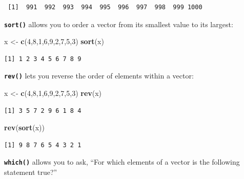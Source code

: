 \documentclass[
]{book}
\newenvironment{Shaded}{\begin{snugshade}}{\end{snugshade}}
\newcommand{\DecValTok}[1]{\textcolor[rgb]{0.00,0.00,0.81}{#1}}
\newcommand{\KeywordTok}[1]{\textcolor[rgb]{0.13,0.29,0.53}{\textbf{#1}}}
\newcommand{\NormalTok}[1]{#1}
\newcommand{\StringTok}[1]{\textcolor[rgb]{0.31,0.60,0.02}{#1}}
\begin{document}
\begin{verbatim}
 [1]  991  992  993  994  995  996  997  998  999 1000
\end{verbatim}

\textbf{\texttt{sort()}} allows you to order a vector from its smallest value to its largest:

\begin{Shaded}
\begin{Highlighting}[]
\NormalTok{x <-}\StringTok{ }\KeywordTok{c}\NormalTok{(}\DecValTok{4}\NormalTok{,}\DecValTok{8}\NormalTok{,}\DecValTok{1}\NormalTok{,}\DecValTok{6}\NormalTok{,}\DecValTok{9}\NormalTok{,}\DecValTok{2}\NormalTok{,}\DecValTok{7}\NormalTok{,}\DecValTok{5}\NormalTok{,}\DecValTok{3}\NormalTok{)}
\KeywordTok{sort}\NormalTok{(x)}
\end{Highlighting}
\end{Shaded}

\begin{verbatim}
[1] 1 2 3 4 5 6 7 8 9
\end{verbatim}

\textbf{\texttt{rev()}} lets you reverse the order of elements within a vector:

\begin{Shaded}
\begin{Highlighting}[]
\NormalTok{x <-}\StringTok{ }\KeywordTok{c}\NormalTok{(}\DecValTok{4}\NormalTok{,}\DecValTok{8}\NormalTok{,}\DecValTok{1}\NormalTok{,}\DecValTok{6}\NormalTok{,}\DecValTok{9}\NormalTok{,}\DecValTok{2}\NormalTok{,}\DecValTok{7}\NormalTok{,}\DecValTok{5}\NormalTok{,}\DecValTok{3}\NormalTok{)}
\KeywordTok{rev}\NormalTok{(x)}
\end{Highlighting}
\end{Shaded}

\begin{verbatim}
[1] 3 5 7 2 9 6 1 8 4
\end{verbatim}

\begin{Shaded}
\begin{Highlighting}[]
\KeywordTok{rev}\NormalTok{(}\KeywordTok{sort}\NormalTok{(x))}
\end{Highlighting}
\end{Shaded}

\begin{verbatim}
[1] 9 8 7 6 5 4 3 2 1
\end{verbatim}

\textbf{\texttt{which()}} allows you to ask, ``For which elements of a vector is the following statement true?''
\end{document}
